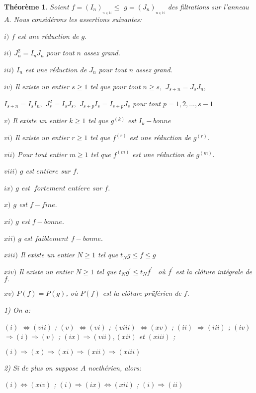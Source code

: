 \documentclass[12pt, a4paper, oneside]{book}
\newtheorem{montheoreme}{Théorème}[chapter]
\begin{document}
\begin{montheoreme}
	Soient $f=(I_{n})_{_{n\in \mathbb{N}}}\leq $ $g=(J_{n})_{_{n\in \mathbb{N}}}$ des filtrations sur l'anneau $A.$ Nous
	considérons les assertions suivantes:
	
	$i)$ $f$ est une réduction de $g.$
	
	$ii)$ $J_{n}^{2}=I_{n}J_{n}$ pour tout $n$ assez grand.
	
	$iii)$ $I_{n}$ est une réduction de $J_{n}$ pour tout $n$ assez grand.
	
	$iv)$ Il existe un entier $s\geq 1$ tel que pour tout $n\geq s,$ $J_{s+n}=J_{s}J_{n},$
	
	$I_{s+n}=I_{s}I_{n},$ $J_{s}^{2}=I_{s}J_{s},$ $J_{s+p}I_{s}=I_{s+p}J_{s}$ pour tout $p=1,2,...,s-1$
	
	$v)$ Il existe un entier $k\geq 1$ tel que $g^{(k)}$ est $I_{k}-bonne$
	
	$vi)$ Il existe un entier $r\geq 1$ tel que $f^{(r)}$ est une réduction de $g^{(r)}.$
	
	$vii)$ Pour tout entier $m\geq 1$ tel que $f^{(m)}$ est une réduction de $g^{(m)}.$
	
	$viii)$ $g$ est $enti\grave{e}re$ sur $f.$
	
	$ix)$ $g$ est $\ fortement$ $enti\grave{e}re$ sur $f.$
	
	$x)$ $g$ est $f-fine.$
	
	$xi)$ $g$ est $f-bonne.$
	
	$xii)$ $g$ est $faiblement$ $f-bonne.$
	
	$xiii)$ Il existe un entier $N\geq 1$ tel que $t_{N}g\leq f\leq g$
	
	$xiv)$ Il existe un entier $N\geq 1$ tel que $t_{N}g^{\prime }\leq
	t_{N}f^{\prime \text{ }}$ o\`{u} $f^{\prime }$ est la clôture intégrale de $f.$
	
	$xv)$ $P(f)=P(g)$, o\`{u} $P(f)$ est la clôture prüférien de $f.$
	
	1) On a:
	
	$(i)$ $\Longleftrightarrow (vii)$ ; $(v)$ $\Longleftrightarrow (vi)$ ; $(viii)$ $\Longleftrightarrow (xv)$ ; $(ii)$ $\Longrightarrow (iii)$ ; $(iv)$ 
	$\Longrightarrow (i)\Longrightarrow (v)$ ; $(ix)\Longrightarrow (vii),(xii)$
	et $(xiii)$ ;
	
	$(i)\Longrightarrow (x)\Longrightarrow (xi)\Longrightarrow
	(xii)\Longrightarrow (xiii)$
	
	2) Si de plus on suppose $A$ noethérien, alors:
	
	$(i)\Longleftrightarrow (xiv)$ ; $(i)\Longrightarrow (ix)\Longleftrightarrow
	(xii)$ ; $(i)\Longrightarrow (ii)$
	

\end{montheoreme}
\end{document}
